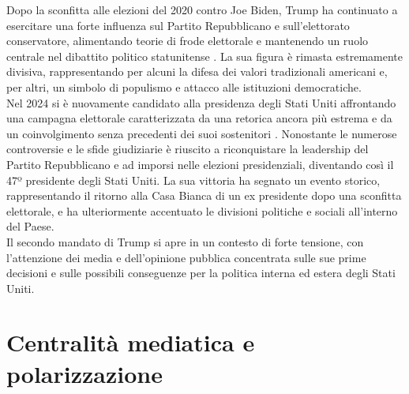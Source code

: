Dopo la sconfitta alle elezioni del 2020 contro Joe Biden, Trump ha continuato a esercitare una forte influenza sul Partito Repubblicano e sull’elettorato conservatore, alimentando teorie di frode elettorale e mantenendo un ruolo centrale nel dibattito politico statunitense \cite{graham2021}. La sua figura è rimasta estremamente divisiva, rappresentando per alcuni la difesa dei valori tradizionali americani e, per altri, un simbolo di populismo e attacco alle istituzioni democratiche. \\ 
Nel 2024 si è nuovamente candidato alla presidenza degli Stati Uniti affrontando una campagna elettorale caratterizzata da una retorica ancora più estrema e da un coinvolgimento senza precedenti dei suoi sostenitori \cite{nyt2024, bbc2024}. Nonostante le numerose controversie e le sfide giudiziarie è riuscito a riconquistare la leadership del Partito Repubblicano e ad imporsi nelle elezioni presidenziali, diventando così il 47º presidente degli Stati Uniti. La sua vittoria ha segnato un evento storico, rappresentando il ritorno alla Casa Bianca di un ex presidente dopo una sconfitta elettorale, e ha ulteriormente accentuato le divisioni politiche e sociali all'interno del Paese. \\
Il secondo mandato di Trump si apre in un contesto di forte tensione, con l’attenzione dei media e dell’opinione pubblica concentrata sulle sue prime decisioni e sulle possibili conseguenze per la politica interna ed estera degli Stati Uniti.\\

\section{Centralità mediatica e polarizzazione}

